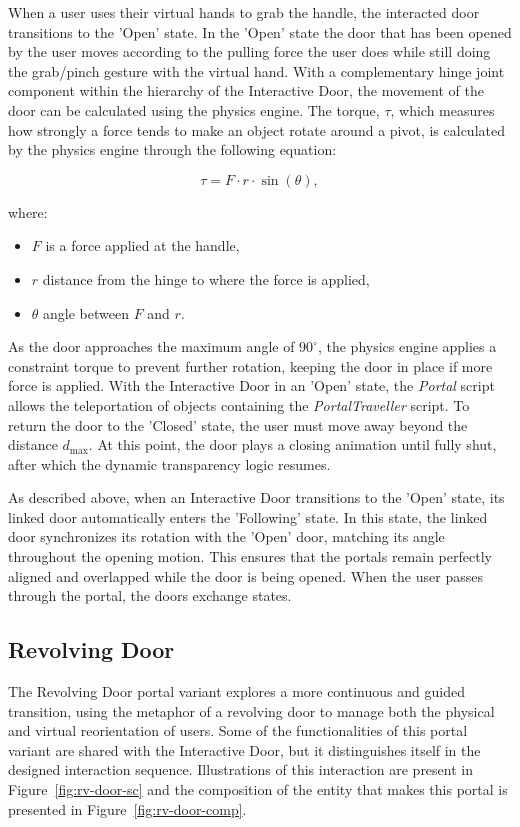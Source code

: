 When a user uses their virtual hands to grab the handle, the interacted door transitions to the 'Open' state. In the 'Open' state the door that has 
been opened by the user moves according to the pulling force the user does while still doing the grab/pinch gesture with the virtual hand. With  
a complementary hinge joint component within the hierarchy of the Interactive Door, the movement of the door can be calculated using the physics 
engine. The torque, $\tau$, which measures how strongly a force tends to make an object rotate around a pivot, is calculated by the physics engine 
through the following equation:

\[
\tau = F \cdot r \cdot \sin(\theta),
\]

where:
\begin{itemize}
  \item \(F\) is a force applied at the handle,
  \item \(r\) distance from the hinge to where the force is applied,
  \item $\theta$ angle between \(F\) and \(r\).
\end{itemize}

As the door approaches the maximum angle of $90^\circ$, the physics engine applies a constraint torque to prevent further rotation, keeping the 
door in place if more force is applied. With the Interactive Door in an 'Open' state, the \textit{Portal} script allows the teleportation of 
objects containing the \textit{PortalTraveller} script. To return the door to the 'Closed' state, the user must 
move away beyond the distance $d_{\max}$. At this point, the door plays a closing animation until fully shut, after which the dynamic transparency 
logic resumes.

As described above, when an Interactive Door transitions to the 'Open' state, its linked door automatically enters the 'Following' state. 
In this state, the linked door synchronizes its rotation with the 'Open' door, matching its angle throughout the opening motion. 
This ensures that the portals remain perfectly aligned and overlapped while the door is being opened. When the user passes through the portal, 
the doors exchange states.

\subsection{Revolving Door}
\label{sec:rev-door}

The Revolving Door portal variant explores a more continuous and guided transition, using the metaphor of a revolving door to manage both the physical and 
virtual reorientation of users. Some of the functionalities of this portal variant are shared with the Interactive Door, but it distinguishes itself 
in the designed interaction sequence. Illustrations of this interaction are present in Figure~\ref{fig:rv-door-sc} and the composition of the entity 
that makes this portal is presented in Figure~\ref{fig:rv-door-comp}.

